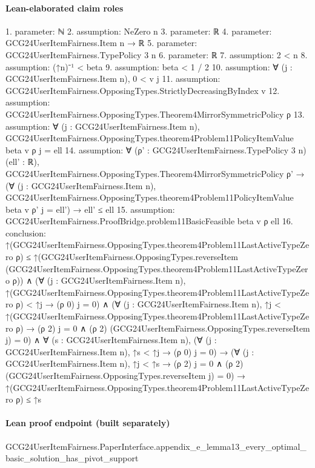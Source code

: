 \documentclass[10pt]{article}
\begin{document}
\paragraph{Lean-elaborated claim roles}\begin{ReviewVerbatim}
1. parameter: ℕ
2. assumption: NeZero n
3. parameter: ℝ
4. parameter: GCG24UserItemFairness.Item n → ℝ
5. parameter: GCG24UserItemFairness.TypePolicy 3 n
6. parameter: ℝ
7. assumption: 2 < n
8. assumption: (↑n)⁻¹ < beta
9. assumption: beta < 1 / 2
10. assumption: ∀ (j : GCG24UserItemFairness.Item n), 0 < v j
11. assumption: GCG24UserItemFairness.OpposingTypes.StrictlyDecreasingByIndex v
12. assumption: GCG24UserItemFairness.OpposingTypes.Theorem4MirrorSymmetricPolicy ρ
13. assumption: ∀ (j : GCG24UserItemFairness.Item n),
  GCG24UserItemFairness.OpposingTypes.theorem4Problem11PolicyItemValue beta v ρ j = ell
14. assumption: ∀ (ρ' : GCG24UserItemFairness.TypePolicy 3 n) (ell' : ℝ),
  GCG24UserItemFairness.OpposingTypes.Theorem4MirrorSymmetricPolicy ρ' →
    (∀ (j : GCG24UserItemFairness.Item n),
        GCG24UserItemFairness.OpposingTypes.theorem4Problem11PolicyItemValue beta v ρ' j = ell') →
      ell' ≤ ell
15. assumption: GCG24UserItemFairness.ProofBridge.problem11BasicFeasible beta v ρ ell
16. conclusion: ↑(GCG24UserItemFairness.OpposingTypes.theorem4Problem11LastActiveTypeZero ρ) ≤
    ↑(GCG24UserItemFairness.OpposingTypes.reverseItem
        (GCG24UserItemFairness.OpposingTypes.theorem4Problem11LastActiveTypeZero ρ)) ∧
  (∀ (j : GCG24UserItemFairness.Item n),
      ↑(GCG24UserItemFairness.OpposingTypes.theorem4Problem11LastActiveTypeZero ρ) < ↑j → (ρ 0) j = 0) ∧
    (∀ (j : GCG24UserItemFairness.Item n),
        ↑j < ↑(GCG24UserItemFairness.OpposingTypes.theorem4Problem11LastActiveTypeZero ρ) →
          (ρ 2) j = 0 ∧ (ρ 2) (GCG24UserItemFairness.OpposingTypes.reverseItem j) = 0) ∧
      ∀ (s : GCG24UserItemFairness.Item n),
        (∀ (j : GCG24UserItemFairness.Item n), ↑s < ↑j → (ρ 0) j = 0) →
          (∀ (j : GCG24UserItemFairness.Item n),
              ↑j < ↑s → (ρ 2) j = 0 ∧ (ρ 2) (GCG24UserItemFairness.OpposingTypes.reverseItem j) = 0) →
            ↑(GCG24UserItemFairness.OpposingTypes.theorem4Problem11LastActiveTypeZero ρ) ≤ ↑s
\end{ReviewVerbatim}

\paragraph{Lean proof endpoint (built separately)}\begin{ReviewVerbatim}
GCG24UserItemFairness.PaperInterface.appendix_e_lemma13_every_optimal_basic_solution_has_pivot_support
\end{ReviewVerbatim}
\end{document}
